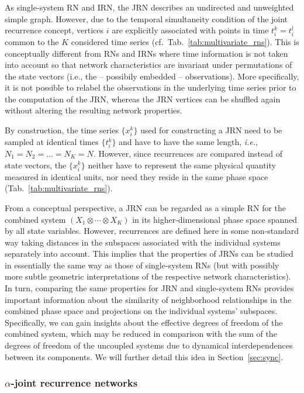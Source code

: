 \documentclass[graybox]{svmult}
\begin{document}
As single-system RN and IRN, the JRN describes an undirected and unweighted simple graph. However, due to the temporal simultaneity condition of the joint recurrence concept, vertices $i$ are explicitly associated with points in time $t^k_i=t^l_i$ common to the $K$ considered time series (cf.~Tab.~\ref{tab:multivariate_rns}). This is conceptually different from RNs and IRNs where time information is not taken into account so that network characteristics are invariant under permutations of the state vectors (i.e., the -- possibily embedded -- observations). More specifically, it is not possible to relabel the observations in the underlying time series prior to the computation of the JRN, whereas the JRN vertices can be shuffled again without altering the resulting network properties. 

By construction, the time series $\{x_i^k\}$ used for constructing a JRN need to be sampled at identical times $\{t^k_i\}$ and have to have the same length, \textit{i.e.}, $N_1=N_2=\dots=N_K=N$. However, since recurrences are compared instead of state vectors, the $\{x_i^k\}$ neither have to represent the same physical quantity measured in identical units, nor need they reside in the same phase space (Tab.~\ref{tab:multivariate_rns}). 

From a conceptual perspective, a JRN can be regarded as a simple RN for the combined system $(X_1\otimes\cdots\otimes X_K)$ in its higher-dimensional phase space spanned by all state variables. However, recurrences are defined here in some non-standard way taking distances in the subspaces associated with the individual systems separately into account. This implies that the properties of JRNs can be studied in essentially the same way as those of single-system RNs (but with possibly more subtle geometric interpretations of the respective network characteristics). In turn, comparing the same properties for JRN and single-system RNs provides important information about the similarity of neighborhood relationships in the combined phase space and projections on the individual systems' subspaces. Specifically, we can gain insights about the effective degrees of freedom of the combined system, which may be reduced in comparison with the sum of the degrees of freedom of the uncoupled systems due to dynamical interdependences between its components. We will further detail this idea in Section~\ref{sec:sync}.


\subsubsection{$\alpha$-joint recurrence networks}\label{sec:jrn_alpha}
\end{document}
